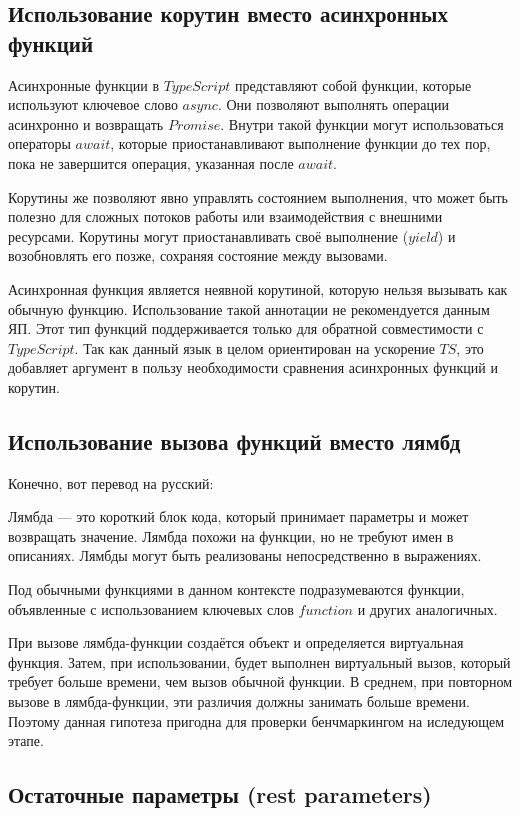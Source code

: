 \documentclass{mipt-thesis-bs}
\begin{document}
\subsection{Использование корутин вместо асинхронных функций}

Асинхронные функции в $TypeScript$ представляют собой функции,
которые используют ключевое слово $async$. Они позволяют выполнять
операции асинхронно и возвращать $Promise$. Внутри такой функции
могут использоваться операторы $await$, которые приостанавливают
выполнение функции до тех пор, пока не завершится операция,
указанная после $await$.

Корутины же позволяют явно управлять состоянием выполнения, что может
быть полезно для сложных потоков работы или взаимодействия
с внешними ресурсами. Корутины могут приостанавливать своё
выполнение ($yield$) и возобновлять его позже, сохраняя
состояние между вызовами.

Асинхронная функция является неявной корутиной, которую нельзя
вызывать как обычную функцию. Использование такой аннотации
не рекомендуется данным ЯП. Этот тип функций поддерживается
только для обратной совместимости с $TypeScript$.
Так как данный язык в целом ориентирован на ускорение $TS$, это
добавляет аргумент в пользу необходимости сравнения асинхронных
функций и корутин.

\subsection{Использование вызова функций вместо лямбд}

Конечно, вот перевод на русский:

Лямбда — это короткий блок кода, который принимает параметры
и может возвращать значение. Лямбда похожи на функции, но не требуют имен
в описаниях. Лямбды могут быть реализованы непосредственно в выражениях.

Под обычными функциями в данном контексте подразумеваются
функции, объявленные с использованием ключевых слов $function$
и других аналогичных.

При вызове лямбда-функции создаётся объект и определяется
виртуальная функция. Затем, при использовании, будет
выполнен виртуальный вызов, который требует больше времени,
чем вызов обычной функции. В среднем, при повторном вызове
в лямбда-функции, эти различия должны занимать больше времени.
Поэтому данная гипотеза пригодна для проверки бенчмаркингом
на иследующем этапе.

\subsection{Остаточные параметры (rest parameters)}
\end{document}
